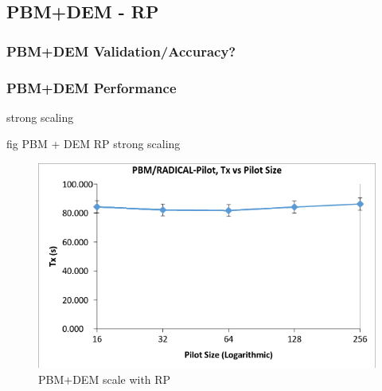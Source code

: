 \documentclass[preprint,11pt,authoryear]{elsarticle}
\begin{document}
    
  \subsection{PBM+DEM - RP} 
    \subsubsection{PBM+DEM Validation/Accuracy?}
   
    
    \subsubsection{PBM+DEM Performance}
    \par strong scaling
    \par fig PBM + DEM RP strong scaling 
      \begin{figure}[!htb]
      \centering
      \includegraphics[scale=0.5]{rslts_pbmbyrp_strng}
      \caption{PBM+DEM scale with RP}
      \label{fig:rslts_dembyRP_strng}
      \end{figure}

\end{document}
